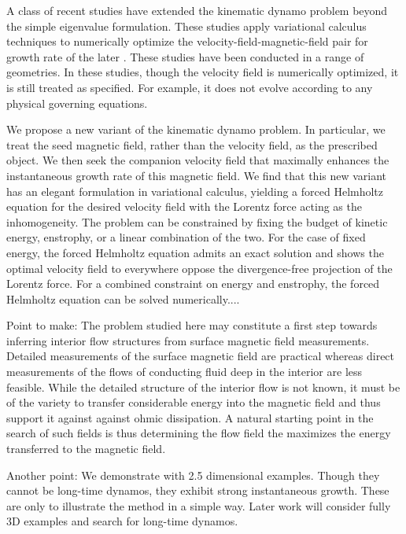 \documentclass[onecolumn,showpacs,preprintnumbers,amsmath,amssymb]{revtex4-2}
\newcommand{\vsp}[1]{\vspace{#1 pc} \noindent}
\begin{document}
A class of recent studies have extended the kinematic dynamo problem beyond the simple eigenvalue formulation. These studies apply variational calculus techniques to numerically optimize the velocity-field-magnetic-field pair for growth rate of the later \cite{Willis2012, Chen2015, Chen2018, Luo2020}. These studies have been conducted in a range of geometries. In these studies, though the velocity field is numerically optimized, it is still treated as specified. For example, it does not evolve according to any physical governing equations. 

We propose a new variant of the kinematic dynamo problem. In particular, we treat the seed magnetic field, rather than the velocity field, as the prescribed object. We then seek the companion velocity field that maximally enhances the instantaneous growth rate of this magnetic field. We find that this new variant has an elegant formulation in variational calculus, yielding a forced Helmholtz equation for the desired velocity field with the Lorentz force acting as the inhomogeneity. The problem can be constrained by fixing the budget of kinetic energy, enstrophy, or a linear combination of the two. For the case of fixed energy, the forced Helmholtz equation admits an exact solution and shows the optimal velocity field to everywhere oppose the divergence-free projection of the Lorentz force. For a combined constraint on energy and enstrophy, the forced Helmholtz equation can be solved numerically....



\vsp{3}
Point to make: The problem studied here may constitute a first step towards inferring interior flow structures from surface magnetic field measurements. Detailed measurements of the surface magnetic field are practical whereas direct measurements of the flows of conducting fluid deep in the interior are less feasible.
While the detailed structure of the interior flow is not known, it must be of the variety to transfer considerable energy into the magnetic field and thus support it against against ohmic dissipation.
A natural starting point in the search of such fields is thus determining the flow field the maximizes the energy transferred to the magnetic field.

\vsp{3}
Another point: We demonstrate with 2.5 dimensional examples. Though they cannot be long-time dynamos, they exhibit strong instantaneous growth. These are only to illustrate the method in a simple way. Later work will consider fully 3D examples and search for long-time dynamos.
\end{document}
